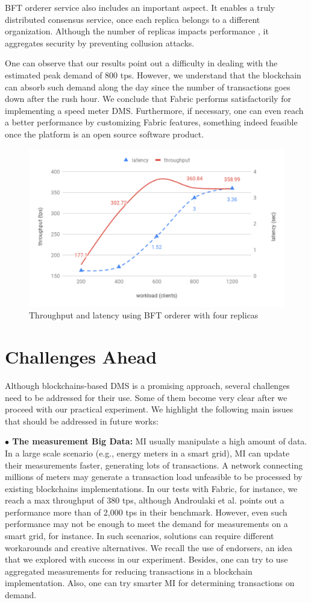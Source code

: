 \documentclass[journal]{IEEEtran}
\begin{document}
BFT orderer service also includes an important aspect.
It enables a truly distributed consensus service, once each replica belongs to a different organization.
Although the number of replicas impacts performance \cite{Bessani2014}, it aggregates security by preventing collusion attacks.

One can observe that our results point out a difficulty in dealing with the estimated peak demand of 800 tps.
However, we understand that the blockchain can absorb such demand along the day since the number of transactions goes down after the rush hour.
We conclude that Fabric performs satisfactorily for implementing a speed meter DMS.
Furthermore, if necessary, one can even reach a better performance by customizing Fabric features, something indeed feasible once the platform is an open source software product.

\begin{figure}[!t]
\centering
\includegraphics[width=.45\textwidth]{chartbft4r} %
\caption{Throughput and latency using BFT orderer with four replicas}
\label{f:latthbft4}
\end{figure}

\section{Challenges Ahead}
Although blockchains-based DMS is a promising approach, several challenges need to be addressed for their use.
Some of them become very clear after we proceed with our practical experiment.
We highlight the following main issues that should be addressed in future works:

\textbf{$\bullet$ The measurement Big Data:} MI usually manipulate a high amount of data. In a large scale scenario (e.g., energy meters in a smart grid), MI can update their measurements faster, generating lots of transactions. 
A network connecting millions of meters may generate a transaction load unfeasible to be processed by existing blockchains implementations. 
In our tests with Fabric, for instance, we reach a max throughput of 380 tps, although Androulaki et al. \cite{Androulaki2018} points out a performance more than of 2,000 tps in their benchmark. 
However, even such performance may not be enough to meet the demand for measurements on a smart grid, for instance.
In such scenarios, solutions can require different workarounds and creative alternatives.
We recall the use of endorsers, an idea that we explored with success in our experiment.
Besides, one can try to use aggregated measurements for reducing transactions in a blockchain implementation. 
Also, one can try smarter MI for determining transactions on demand.
\end{document}
